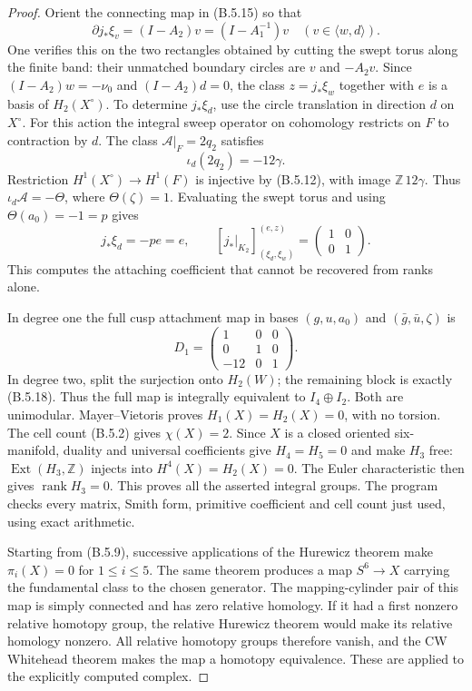 \begin{proof}
Orient the connecting map in (B.5.15) so that
\[
 \partial j_*\xi_v=(I-A_2)v
                   =(I-A_1^{-1})v\quad(v\in\langle w,d\rangle).
\]
One verifies this on the two rectangles obtained
by cutting the swept torus along the finite band:
their unmatched boundary circles are $v$ and
$-A_2v$.  Since $(I-A_2)w=-\nu_0$ and
$(I-A_2)d=0$, the class $z=j_*\xi_w$ together with
$e$ is a basis of $H_2(X^\circ)$.
To determine $j_*\xi_d$, use the circle translation
in direction $d$ on $X^\circ$.  For this action the
integral sweep operator on cohomology restricts on
$F$ to contraction by $d$.  The class
$\mathcal A|_F=2q_2$ satisfies
\[
 \iota_d(2q_2)=-12\gamma.
\]
Restriction $H^1(X^\circ)\to H^1(F)$ is injective
by (B.5.12), with image $\mathbb Z\,12\gamma$.
Thus $\iota_d\mathcal A=-\Theta$, where
$\Theta(\zeta)=1$.  Evaluating the swept torus and
using $\Theta(a_0)=-1=p$ gives
\[
 j_*\xi_d=-p e=e,
 \qquad
 [j_*|_{K_2}]_{(\xi_d,\xi_w)}^{(e,z)}
       =\begin{pmatrix}1&0\\0&1\end{pmatrix}.
 \tag{B.5.18}
\]
This computes the attaching coefficient that cannot
be recovered from ranks alone.

In degree one the full cusp attachment map in bases
$(g,u,a_0)$ and $(\bar g,\bar u,\zeta)$ is
\[
 D_1=\begin{pmatrix}1&0&0\\0&1&0\\-12&0&1\end{pmatrix}.
\]
In degree two, split the surjection onto $H_2(W)$;
the remaining block is exactly (B.5.18).  Thus the
full map is integrally equivalent to $I_4\oplus I_2$.
Both are unimodular.  Mayer--Vietoris proves
$H_1(X)=H_2(X)=0$, with no torsion.  The cell count
(B.5.2) gives $\chi(X)=2$.  Since $X$ is a closed
oriented six-manifold, duality and universal
coefficients give $H_4=H_5=0$ and make $H_3$ free:
$\operatorname{Ext}(H_3,\mathbb Z)$ injects into
$H^4(X)=H_2(X)=0$.  The Euler characteristic then
gives $\operatorname{rank}H_3=0$.  This proves all
the asserted integral groups.  The program checks
every matrix, Smith form, primitive coefficient
and cell count just used, using exact arithmetic.

Starting from (B.5.9), successive applications of
the Hurewicz theorem make $\pi_i(X)=0$ for
$1\leq i\leq5$.  The same theorem produces a map
$S^6\to X$ carrying the fundamental class to the
chosen generator.  The mapping-cylinder pair of
this map is simply connected and has zero relative
homology.  If it had a first nonzero relative
homotopy group, the relative Hurewicz theorem
would make its relative homology nonzero.  All
relative homotopy groups therefore vanish, and
the CW Whitehead theorem makes the map a homotopy
equivalence.  These
are \cite[Theorems 4.32 and 4.5]{mapsHatcher02}
applied to the explicitly computed complex.


\end{proof}

